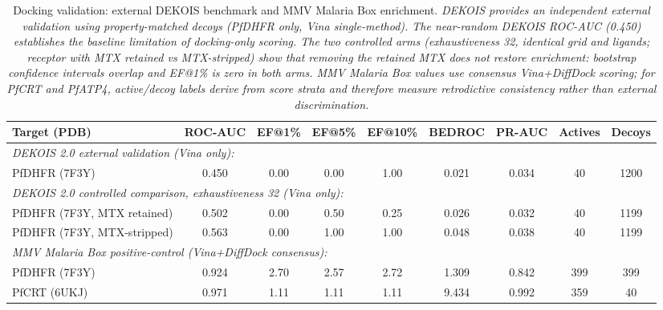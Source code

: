 
\begin{table}[ht!]
\centering
\caption{Docking validation: external DEKOIS benchmark and MMV Malaria Box enrichment. \textit{DEKOIS provides an independent external validation using property-matched decoys (PfDHFR only, Vina single-method). The near-random DEKOIS ROC-AUC (\num{0.450}) establishes the baseline limitation of docking-only scoring. The two controlled arms (exhaustiveness \num{32}, identical grid and ligands; receptor with MTX retained vs MTX-stripped) show that removing the retained MTX does not restore enrichment: bootstrap confidence intervals overlap and EF@1\% is zero in both arms. MMV Malaria Box values use consensus Vina+DiffDock scoring; for PfCRT and PfATP4, active/decoy labels derive from score strata and therefore measure retrodictive consistency rather than external discrimination.}}
\label{tab:sm_enrichment_validation}
\scriptsize
\begin{tabular}{lcccccccc}
\toprule
\textbf{Target (PDB)} & \textbf{ROC-AUC} & \textbf{EF@1\%} & \textbf{EF@5\%} & \textbf{EF@10\%} & \textbf{BEDROC} & \textbf{PR-AUC} & \textbf{Actives} & \textbf{Decoys} \\
\midrule
\multicolumn{9}{l}{\textit{DEKOIS 2.0 external validation (Vina only):}} \\
PfDHFR (7F3Y) & \num{0.450} & \num{0.00} & \num{0.00} & \num{1.00} & \num{0.021} & \num{0.034} & \num{40} & \num{1200} \\
\multicolumn{9}{l}{\textit{DEKOIS 2.0 controlled comparison, exhaustiveness \num{32} (Vina only):}} \\
PfDHFR (7F3Y, MTX retained) & \num{0.502} & \num{0.00} & \num{0.50} & \num{0.25} & \num{0.026} & \num{0.032} & \num{40} & \num{1199} \\
PfDHFR (7F3Y, MTX-stripped) & \num{0.563} & \num{0.00} & \num{1.00} & \num{1.00} & \num{0.048} & \num{0.038} & \num{40} & \num{1199} \\
\midrule
\multicolumn{9}{l}{\textit{MMV Malaria Box positive-control (Vina+DiffDock consensus):}} \\
PfDHFR (7F3Y) & \num{0.924} & \num{2.70} & \num{2.57} & \num{2.72} & \num{1.309} & \num{0.842} & \num{399} & \num{399} \\
PfCRT (6UKJ) & \num{0.971} & \num{1.11} & \num{1.11} & \num{1.11} & \num{9.434} & \num{0.992} & \num{359} & \num{40} \\

\end{tabular}
\end{table}
